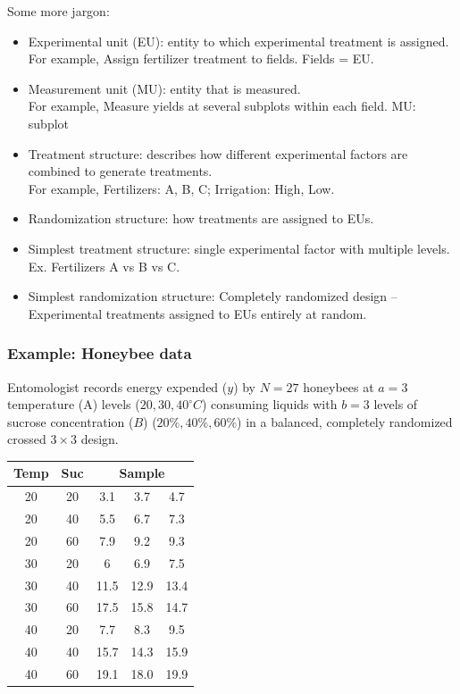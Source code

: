 Some more jargon:
\begin{itemize}
	\item Experimental unit (EU): entity to which experimental treatment is assigned.\\
	For example, Assign fertilizer treatment to fields.  Fields = EU.
	\item Measurement unit (MU): entity that is measured.\\
	For example, Measure yields at several subplots within each field.  MU: subplot
	\item Treatment structure: describes how different experimental factors are combined to generate treatments.\\
	For example, Fertilizers: A, B, C; Irrigation: High, Low.
	\item Randomization structure: how treatments are assigned to EUs.
	\item Simplest treatment structure: single experimental factor with multiple levels.  Ex. Fertilizers A vs B vs C.
	\item Simplest randomization structure: Completely randomized design -- Experimental treatments assigned to EUs entirely at random.
\end{itemize}

\subsubsection*{Example: Honeybee data}
Entomologist records energy expended ($y$) by $N=27$ honeybees at $a=3$ temperature (A) levels ($20, 30, 40^{\circ}C$) consuming liquids with $b = 3$ levels of sucrose concentration ($B$) ($20\%, 40\%, 60\%$) in a balanced, completely randomized crossed $3 \times 3$ design. 
\begin{table}[H]
	\renewcommand{\arraystretch}{1.5}
	\centering
	\begin{tabular}{cc|ccc}
		\toprule
		Temp & Suc & \multicolumn{3}{c}{Sample}\\
		\hline
		20 & 20 & 3.1 & 3.7 & 4.7\\
		20 & 40 & 5.5 & 6.7 & 7.3\\
		20 & 60 & 7.9 & 9.2 & 9.3\\
		30 & 20 & 6 & 6.9 & 7.5\\
		30 & 40 & 11.5 & 12.9 & 13.4\\
		30 & 60 & 17.5 & 15.8 & 14.7\\
		40 & 20 & 7.7 & 8.3 & 9.5\\
		40 & 40 & 15.7 & 14.3 & 15.9\\
		40 & 60 & 19.1 & 18.0 & 19.9\\
		
		\bottomrule
	\end{tabular}
\end{table}

